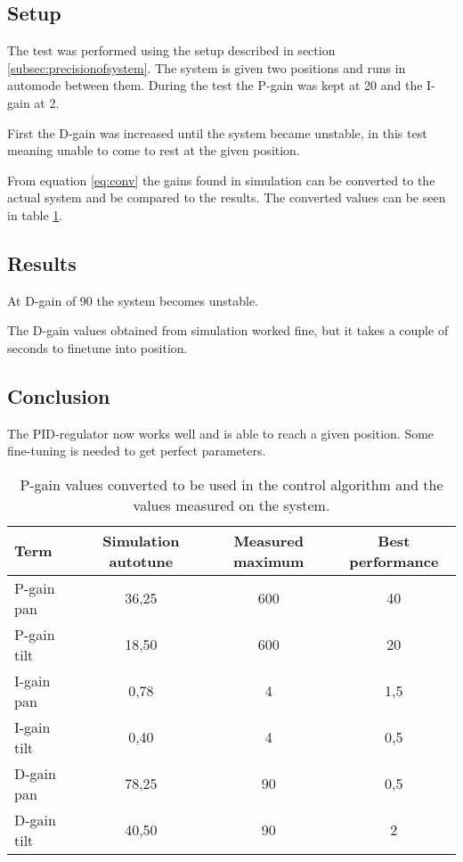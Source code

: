 \subsection*{Setup}
The test was performed using the setup described in
section \ref{subsec:precisionofsystem}. The system is given two positions and runs in automode between them. During the test
the P-gain was kept at 20 and the I-gain at 2.

First the D-gain was increased until the system became unstable, in this test
meaning unable to come to rest at the given position.

From equation \ref{eq:conv} the gains found in simulation can be converted to the actual
system and be compared to the results. The converted values can be seen in
table \ref{tab:actual_gain_values}. 

\subsection*{Results}
At D-gain of 90 the system becomes unstable.

The D-gain values obtained from simulation worked fine, but it takes a couple of
seconds to finetune into position.

\subsection*{Conclusion}
The PID-regulator now works well and is able to reach a given position. Some
fine-tuning is needed to get perfect parameters.

\begin{table}[htb]
	\centering
	\begin{tabular}{lccc}			
	Term & Simulation autotune & Measured maximum & Best performance  \\
	\midrule								
	P-gain pan & 36,25 & 600 & 40 \\
	P-gain tilt   & 18,50 & 600 & 20 \\
	I-gain pan  & 0,78 & 4 & 1,5 \\
	I-gain tilt   & 0,40  & 4 & 0,5 \\
	D-gain pan & 78,25 & 90 & 0,5 \\
	D-gain tilt   & 40,50 & 90 & 2 \\
	\end{tabular}
	\caption{P-gain values converted to be used in the control algorithm and the values measured on the system.}				
	\label{tab:actual_gain_values}			
\end{table}

